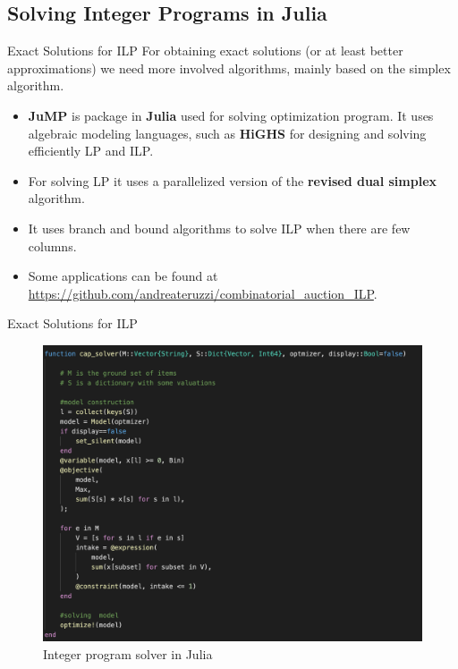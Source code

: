 \documentclass[aspectratio=169,xcolor=dvipsnames]{beamer}
\begin{document}
    \subsection{Solving Integer Programs in Julia}
    \begin{frame}{Exact Solutions for ILP}
    For obtaining exact solutions (or at least better approximations) we need more involved algorithms, mainly based on the simplex algorithm.  
    \vspace{10pt}
\pause
    \begin{itemize}
        \item \textbf{JuMP} is package in \textbf{Julia} used for solving optimization program. It uses algebraic modeling languages, such as \textbf{HiGHS} for designing and solving efficiently LP and ILP.
\pause        
        \item For solving LP it uses a parallelized version of the  \textbf{revised dual simplex} algorithm.
\pause
        \item It uses branch and bound algorithms to solve ILP when there are few columns.
\pause
        \item Some applications can be found at \url{https://github.com/andreateruzzi/combinatorial_auction_ILP}.
    \end{itemize}
 
    \end{frame}
     \begin{frame}{Exact Solutions for ILP}
     \begin{figure}
        \includegraphics[width=1\textwidth, height=0.7\textheight, keepaspectratio]{utilities/cap_solver.png}
        \caption{Integer program solver in Julia} \label{fig:3}
    \end{figure}
     
     \end{frame}
\end{document}
